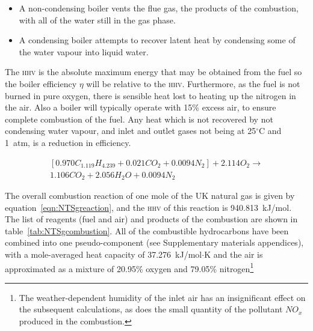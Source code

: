 \documentclass[5p]{elsarticle} %
\begin{document}
\begin{itemize}
    \item A non-condensing boiler vents the flue gas, the products of the combustion, with all of the water still in the gas phase.
    \item A condensing boiler attempts to recover latent heat by condensing some of the water vapour into liquid water. 
\end{itemize}

The \textsc{hhv} is the absolute maximum energy that may be obtained from the fuel so the boiler efficiency $\eta$ will be relative to the \textsc{hhv}\citep{saty2018}.
Furthermore, as the fuel is not burned in pure oxygen, there is sensible heat lost to heating up the nitrogen in the air. 
Also a  boiler will typically operate with 15\% excess air, to ensure complete combustion of the fuel\citep{CleaverBooks2016}.
Any heat which is not recovered by not condensing water vapour, and inlet and outlet gases not being at 25$^\circ$C and 1~atm, is a reduction in efficiency\citep{saty2018}.

\begin{multline}
    \label{eqn:NTSgreaction}
    [0.970 C_{1.119} H_{4.239} + 0.021 C O_2 + 0.0094 N_2] + 2.114 O_2 \longrightarrow \\
    1.106 C O_2 + 2.056 H_2 O + 0.0094 N_2
\end{multline}

The overall combustion reaction of one mole of the UK natural gas is given by equation~\eqref{eqn:NTSgreaction}, and the \textsc{hhv} of this reaction is 940.813~kJ/mol\citep{nist_delta_H}.
The list of reagents (fuel and air) and products of the combustion are shown in table~\ref{tab:NTSgcombustion}.
All of the combustible hydrocarbons have been combined into one pseudo-component\citep{coolprop} (see %
Supplementary materials appendices), 
with a mole-averaged heat capacity of 37.276~kJ/mol$\cdot$K\citep{Huber2022} and the air is approximated as a mixture of 20.95\% oxygen and 79.05\% nitrogen\footnote{The weather-dependent humidity of the inlet air has an insignificant effect on the subsequent calculations, as does the small quantity of the pollutant $NO_{x}$ produced in the combustion.}
\end{document}
